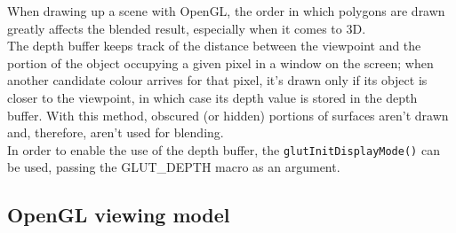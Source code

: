 When drawing up a scene with OpenGL, the order in which polygons are drawn
greatly affects the blended result, especially when it comes to 3D.
\\
The depth buffer keeps track of the distance between the viewpoint and 
the portion of the object occupying a given pixel in a window on the 
screen; when another candidate colour arrives for that pixel, it's drawn 
only if its object is closer to the viewpoint, in which case its depth
value is stored in the depth buffer. With this method, obscured (or hidden)
portions of surfaces aren't drawn and, therefore, aren't used for
blending.
\\
In order to enable the use of the depth buffer, the 
\texttt{glutInitDisplayMode()} can be used, passing the 
GLUT\_DEPTH macro as an argument.

\subsection{OpenGL viewing model}
\label{opengl:opengl_note:viewing_model}

